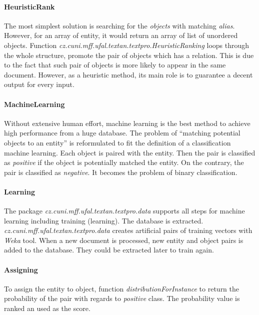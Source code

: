 \paragraph{HeuristicRank}
The most simplest solution is searching for the \textit{objects} with matching 
\textit{alias}. However, for an array of entity, it would return an array of 
list of unordered objects.
Function \emph{cz.cuni.mff.ufal.textan.textpro.HeuristicRanking} loops through 
the whole structure, promote the pair of objects which has a relation. This is 
due to the fact that such pair of objects is more likely to appear in the same
document. However, as a heuristic method, its main role is to guarantee a decent
output for every input.


\paragraph{MachineLearning}
Without extensive human effort, machine learning is the best method to achieve
high performance from a huge database. The problem of ``matching potential objects
to an entity'' is reformulated to fit the definition of a classification machine 
learning. Each object is paired with the entity. Then the pair is classified as
\emph{positive} if the object is potentially matched the entity. On the contrary,
the pair is classified as \emph{negative}. It becomes the problem of binary 
classification.

\paragraph{Learning}
The package \emph{cz.cuni.mff.ufal.textan.textpro.data} supports all steps for machine
learning including training (learning). The database is extracted. 
\emph{cz.cuni.mff.ufal.textan.textpro.data} creates 
artificial pairs of training vectors with \textit{Weka} tool. When a new document is
processed, new entity and object pairs is added to the database. They could be extracted
later to train again.

\paragraph{Assigning}
To assign the entity to object, function \emph{distributionForInstance} to return the 
probability of the pair with regards to \emph{positive} class. The probability value 
is ranked an used as the score.

